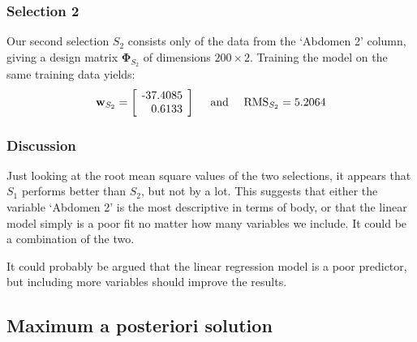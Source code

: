 \documentclass{article}
\newcommand{\vect}[1]{\ensuremath{\boldsymbol{\mathbf{#1}}}\xspace}
\begin{document}
\subsubsection{Selection 2}

Our second selection $S_2$ consists only of the data from the `Abdomen
2' column, giving a design matrix $\vect{\Phi}_{S_2}$ of dimensions
$200\times 2$. Training the model on the same training data yields:
\[
\vect{w}_{S_2} = \left[\!\begin{tabular}{r@{.}l}
  -37 & 4085\\
  0 & 6133
  \end{tabular}\!\right]\quad
\text{ and }\quad \mathrm{RMS}_{S_2} = 5.2064
\]

\subsubsection{Discussion}
Just looking at the root mean square values of the two selections, it
appears that $S_1$ performs better than $S_2$, but not by a lot. This
suggests that either the variable `Abdomen 2' is the most descriptive
in terms of body, or that the linear model simply is a poor fit no
matter how many variables we include. It could be a combination of the
two.

It could probably be argued that the linear regression model is a poor
predictor, but including more variables should improve the results.

\subsection{Maximum a posteriori solution}

\end{document}
